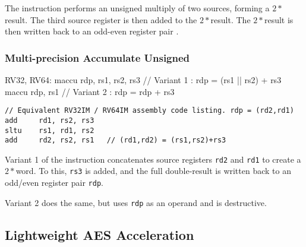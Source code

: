 The  instruction performs an unsigned multiply
of two \XLEN sources, forming a $2*$\XLEN result.
The third \XLEN source register is then added to the $2*$\XLEN result.
The $2*$\XLEN result is then written back to an odd-even register
pair \rdp.


\subsubsection{Multi-precision Accumulate Unsigned}

\begin{cryptoisa}
RV32, RV64:
    maccu   rdp, rs1, rs2, rs3  // Variant 1 : rdp = (rs1 || rs2) + rs3
    maccu   rdp, rs1            // Variant 2 : rdp =  rdp         + rs3
\end{cryptoisa}

\begin{lstlisting}[]
// Equivalent RV32IM / RV64IM assembly code listing. rdp = (rd2,rd1)
add     rd1, rs2, rs3
sltu    rs1, rd1, rs2
add     rd2, rs2, rs1   // (rd1,rd2) = (rs1,rs2)+rs3
\end{lstlisting}

Variant 1 of the  instruction
concatenates source registers
{\tt rd2}
and
{\tt rd1}
to create a $2*$\XLEN word.
To this,
{\tt rs3} is added,
and the full double-\XLEN result is written back to
an odd/even register pair {\tt rdp}.

Variant 2 does the same, but uses {\tt rdp} as an operand and is
destructive.



\subsection{Lightweight AES Acceleration}


